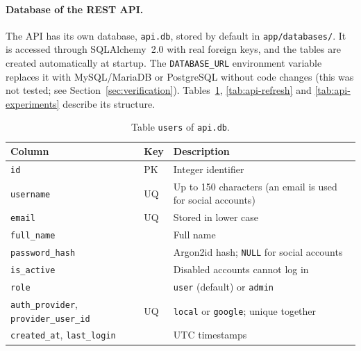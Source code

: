 \documentclass[9pt,a4paper,twocolumn]{article}
\begin{document}
\paragraph{Database of the REST API.} The API has its own database, \texttt{api.db}, stored by default in \texttt{app/databases/}. It is accessed through SQLAlchemy~2.0 with real foreign keys, and the tables are created automatically at startup. The \texttt{DATABASE\_URL} environment variable replaces it with MySQL/MariaDB or PostgreSQL without code changes (this was not tested; see Section~\ref{sec:verification}). Tables~\ref{tab:api-users}, \ref{tab:api-refresh} and \ref{tab:api-experiments} describe its structure.

\begin{table}[H]
\centering
\scriptsize
\begin{tabularx}{\columnwidth}{l l X}
\hline
\textbf{Column} & \textbf{Key} & \textbf{Description} \\
\hline
\texttt{id}               & PK & Integer identifier \\
\texttt{username}         & UQ & Up to 150 characters (an email is used for social accounts) \\
\texttt{email}            & UQ & Stored in lower case \\
\texttt{full\_name}       &    & Full name \\
\texttt{password\_hash}   &    & Argon2id hash; \texttt{NULL} for social accounts \\
\texttt{is\_active}       &    & Disabled accounts cannot log in \\
\texttt{role}             &    & \texttt{user} (default) or \texttt{admin} \\
\texttt{auth\_provider}, \texttt{provider\_user\_id} & UQ & \texttt{local} or \texttt{google}; unique together \\
\texttt{created\_at}, \texttt{last\_login} & & UTC timestamps \\
\hline
\end{tabularx}
\caption{Table \texttt{users} of \texttt{api.db}.}
\label{tab:api-users}
\end{table}
\end{document}
